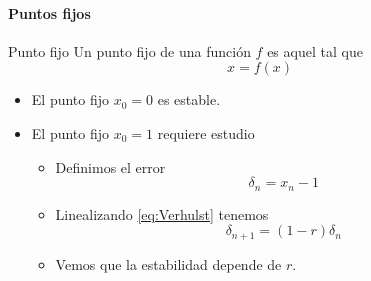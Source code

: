 \documentclass[8pt]{beamer}
\begin{document}
\begin{frame}
\framesubtitle{Puntos fijos}

\begin{block}{Punto fijo}
Un punto fijo de una función $f$ es aquel tal que
\[x=f(x)\]
\end{block}

\begin{itemize}
\item El punto fijo $x_0=0$ es estable.
\item El punto fijo $x_0=1$ requiere estudio
\begin{itemize}
\item Definimos el error
\[δ_n = x_n-1\]
\item Linealizando \eqref{eq:Verhulst} tenemos
\[δ_{n+1} = (1-r)δ_n\]
\item Vemos que la estabilidad depende de $r$.
\end{itemize}
\end{itemize}
\end{frame}
\end{document}
